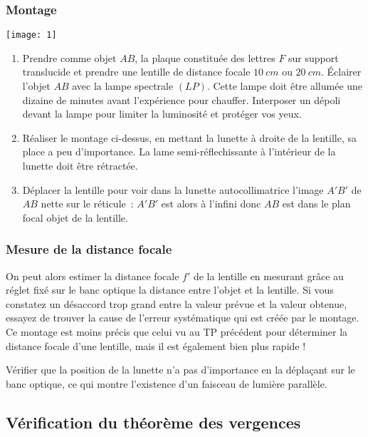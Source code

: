 \documentclass[a4paper, 12pt, final, garamond]{book}
\begin{document}
\subsubsection{Montage}

  \begin{center}
    \texttt{[image: 1]}
  \end{center}
  
\begin{enumerate}
    \item  Prendre comme objet $AB$, la plaque constituée des lettres $F$ sur
        support translucide et prendre une lentille de distance focale
        $\SI{10}{cm}$ ou $\SI{20}{cm}$. Éclairer l'objet $AB$ avec la lampe
        spectrale $(LP)$. Cette lampe doit être allumée une dizaine de minutes
        avant l'expérience pour chauffer. Interposer un dépoli devant la lampe
        pour limiter la luminosité et protéger vos yeux. 
    \item  Réaliser le montage ci-dessus, en mettant la lunette à droite de la
        lentille, sa place a peu d'importance. La lame semi-réflechissante à
        l'intérieur de la lunette doit être rétractée.
    \item  Déplacer la lentille pour voir dans la lunette autocollimatrice
        l'image $A'B'$ de $AB$  nette sur le réticule~: $A'B'$ est alors à
        l'infini donc $AB$ est dans le plan focal objet de la lentille. 
\end{enumerate} 

\subsubsection{Mesure de la distance focale}

On peut alors estimer la distance focale $f'$ de la lentille en mesurant grâce
au réglet fixé sur le banc optique la distance entre l'objet et la lentille. Si
vous constatez un désaccord trop grand entre la valeur prévue et la valeur
obtenue, essayez de trouver la cause de l'erreur systématique qui est créée par
le montage. Ce montage est moins précis que celui vu au TP précédent pour
déterminer la distance focale d'une lentille, mais il est également bien plus
rapide !

\bigskip

Vérifier que la position de la lunette n'a pas d'importance en la déplaçant sur
le banc optique, ce qui montre l'existence d'un faisceau de lumière parallèle.

\subsection{Vérification du théorème des vergences}
\end{document}
